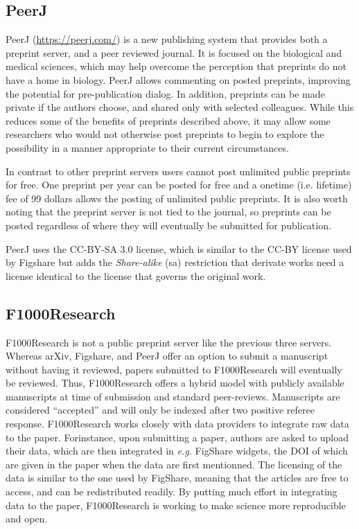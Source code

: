 \documentclass[letterpaper,twocolumn,superscriptaddress,showkeys]{revtex4-1}
\begin{document}
\subsection{PeerJ}

PeerJ (\href{https://peerj.com/}{https://peerj.com/}) is a new publishing system
that provides both a preprint server, and a peer reviewed journal.  It is
focused on the biological and medical sciences, which may help overcome the
perception that preprints do not have a home in biology.  PeerJ allows
commenting on posted preprints, improving the potential for pre-publication
dialog. In addition, preprints can be made private if the authors choose, and
shared only with selected colleagues. While this reduces some of the benefits of
preprints described above, it may allow some researchers who would not otherwise
post preprints to begin to explore the possibility in a manner appropriate to
their current circumstances.

In contrast to other preprint servers users cannot post unlimited public
preprints for free. One preprint per year can be posted for free and a onetime
(i.e. lifetime) fee of 99 dollars allows the posting of unlimited public
preprints. It is also worth noting that the preprint server is not tied to the
journal, so preprints can be posted regardless of where they will eventually be
submitted for publication.

PeerJ uses the CC-BY-SA 3.0 license, which is similar to the CC-BY license used
by Figshare but adds the \emph{Share-alike} (sa) restriction that derivate works
need a license identical to the license that governs the original work.

\subsection{F1000Research}

F1000Research is not a public preprint server like the previous three servers.
Whereas arXiv, Figshare, and PeerJ offer an option to submit a manuscript
without having it reviewed, papers submitted to F1000Research will eventually
be reviewed. Thus, F1000Research offers a hybrid model with publicly available
manuscripts at time of submission and standard peer-reviews. Manuscripts are
considered ``accepted'' and will only be indexed after two positive referee
response. F1000Research works closely with data providers to integrate raw
data to the paper. Forinstance, upon submitting a paper, authors are asked to
upload their data, which are then integrated in \emph{e.g.} FigShare widgets,
the DOI of which are given in the paper when the data are first mentionned.
The licensing of the data is similar to the one used by FigShare, meaning that
the articles are free to access, and can be redistributed readily. By putting
much effort in integrating data to the paper, F1000Research is working to make
science more reproducible and open.
\end{document}
